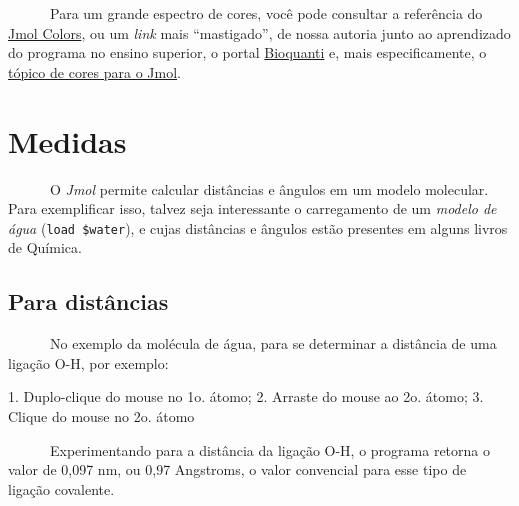 \documentclass[
  letterpaper,
  DIV=11,
  numbers=noendperiod]{scrreprt}
\newenvironment{Shaded}{\begin{snugshade}}{\end{snugshade}}
\newcommand{\DecValTok}[1]{\textcolor[rgb]{0.68,0.00,0.00}{#1}}
\newcommand{\FloatTok}[1]{\textcolor[rgb]{0.68,0.00,0.00}{#1}}
\newcommand{\NormalTok}[1]{\textcolor[rgb]{0.00,0.23,0.31}{#1}}
\newcommand{\SpecialCharTok}[1]{\textcolor[rgb]{0.37,0.37,0.37}{#1}}
\begin{document}
~~~~~~Para um grande espectro de cores, você pode consultar a referência
do \href{https://jmol.sourceforge.net/jscolors/}{Jmol Colors}, ou um
\emph{link} mais ``mastigado'', de nossa autoria junto ao aprendizado do
programa no ensino superior, o portal
\href{https://bioquanti.netlify.app/}{Bioquanti} e, mais
especificamente, o
\href{https://bioquanti.netlify.app/uploads/jmolbook/jmolquarto/comandos\#cores-espec\%C3\%ADficas}{tópico
de cores para o Jmol}.

\section{Medidas}\label{medidas}

~~~~~~O \emph{Jmol} permite calcular distâncias e ângulos em um modelo
molecular. Para exemplificar isso, talvez seja interessante o
carregamento de um \emph{modelo de água} (\texttt{load\ \$water}), e
cujas distâncias e ângulos estão presentes em alguns livros de Química.

\subsection{Para distâncias}\label{para-distuxe2ncias}

~~~~~~No exemplo da molécula de água, para se determinar a distância de
uma ligação O-H, por exemplo:

\begin{Shaded}
\begin{Highlighting}[]
\FloatTok{1.}\NormalTok{ Duplo}\SpecialCharTok{{-}}\NormalTok{clique do mouse no }\DecValTok{1}\NormalTok{o. átomo;}
\FloatTok{2.}\NormalTok{ Arraste do mouse ao }\DecValTok{2}\NormalTok{o. átomo;}
\FloatTok{3.}\NormalTok{ Clique do mouse no }\DecValTok{2}\NormalTok{o. átomo}
\end{Highlighting}
\end{Shaded}

~~~~~~Experimentando para a distância da ligação O-H, o programa retorna
o valor de 0,097 nm, ou 0,97 Angstroms, o valor convencial para esse
tipo de ligação covalente.
\end{document}
